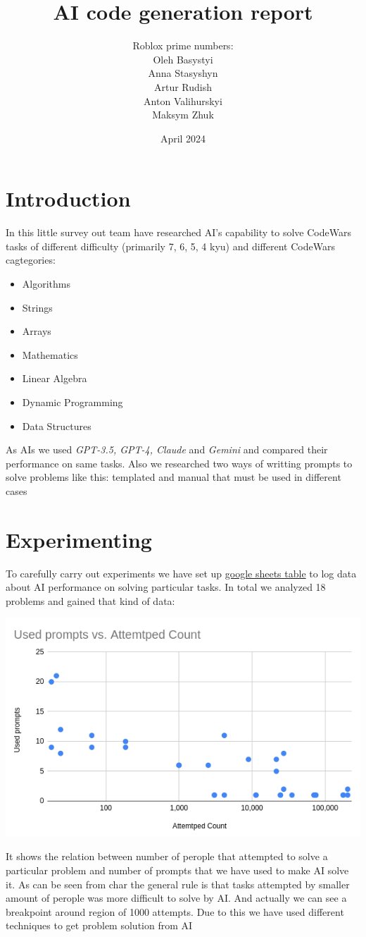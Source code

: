 \documentclass[12pt]{report}
\title{AI code generation report}
\author{Roblox prime numbers:\\\small{Oleh Basystyi}\\\small{Anna Stasyshyn}
\\\small{Artur Rudish}\\\small{Anton Valihurskyi}\\\small{Maksym Zhuk}}
\date{April 2024}
\begin{document}
	\maketitle	
	\renewcommand{\thesection}{\arabic{section}}
	\section{Introduction}
	In this little survey out team have researched AI's capability to solve CodeWars tasks of different difficulty (primarily 7, 6, 5, 4 kyu) and different CodeWars cagtegories:
	\begin{itemize}
		\itemsep0em 
		\item Algorithms
		\item Strings
		\item Arrays
		\item Mathematics
		\item Linear Algebra
		\item Dynamic Programming
		\item Data Structures
	\end{itemize}
	As AIs we used \textit{GPT-3.5, GPT-4, Claude} and \textit{Gemini} and compared their performance on same tasks. Also we researched two ways of writting prompts to solve problems like this: templated and manual that must be used in different cases
	
	\pagebreak
	\section{Experimenting}
	To carefully carry out experiments we have set up \href{https://docs.google.com/spreadsheets/d/1qXPyAJsOOpmtxIoGqObwG5mTaLU3IWO0SQRGbjZPhEc/edit#gid=0}{google sheets table} to log data about AI performance on solving particular tasks. In total we analyzed 18 problems and gained that kind of data:
	
	\includegraphics[width=\textwidth]{used_prompts_attempted_relation.png}
	
	It shows the relation between number of perople that attempted to solve a particular problem and number of prompts that we have used to make AI solve it. As can be seen from char the general rule is that tasks attempted by smaller amount of perople was more difficult to solve by AI. And actually we can see a breakpoint around region of 1000 attempts. Due to this we have used different techniques to get problem solution from AI
	
\end{document}
